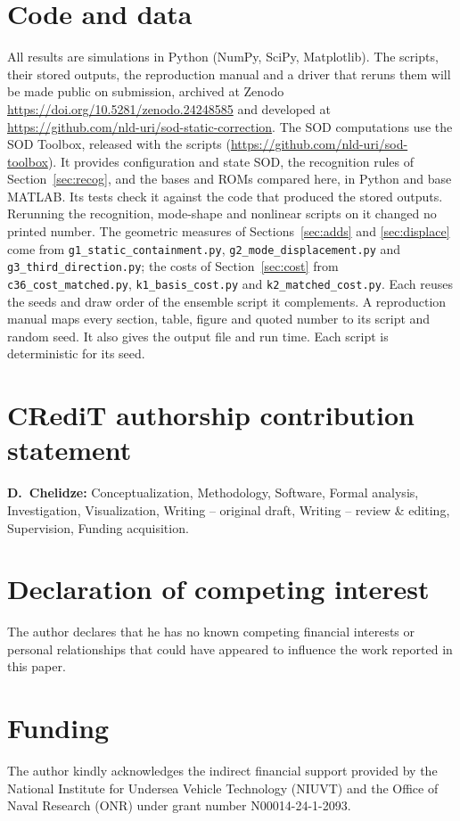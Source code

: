 \documentclass[preprint,12pt]{elsarticle}
\begin{document}
\section{Code and data}\label{app:repro}
All results are simulations in Python (NumPy, SciPy, Matplotlib). The scripts, their stored outputs, the reproduction manual and a driver that reruns them will be made public on submission, archived at Zenodo \url{https://doi.org/10.5281/zenodo.24248585} and developed at \url{https://github.com/nld-uri/sod-static-correction}.
The SOD computations use the SOD Toolbox, released with the scripts (\url{https://github.com/nld-uri/sod-toolbox}).
It provides configuration and state SOD, the recognition rules of Section~\ref{sec:recog}, and the bases and ROMs compared here, in Python and base MATLAB.
Its tests check it against the code that produced the stored outputs. Rerunning the recognition, mode-shape and nonlinear scripts on it changed no printed number.
The geometric measures of Sections~\ref{sec:adds} and \ref{sec:displace} come from \texttt{g1\_static\_containment.py}, \texttt{g2\_mode\_displacement.py} and \texttt{g3\_third\_direction.py}; the costs of Section~\ref{sec:cost} from \texttt{c36\_cost\_matched.py}, \texttt{k1\_basis\_cost.py} and \texttt{k2\_matched\_cost.py}. Each reuses the seeds and draw order of the ensemble script it complements.
A reproduction manual maps every section, table, figure and quoted number to its script and random seed. It also gives the output file and run time. Each script is deterministic for its seed.

\section*{CRediT authorship contribution statement}
\textbf{D.~Chelidze:} Conceptualization, Methodology, Software, Formal analysis, Investigation, Visualization, Writing -- original draft, Writing -- review \& editing, Supervision, Funding acquisition.

\section*{Declaration of competing interest}
The author declares that he has no known competing financial interests or personal relationships that could have appeared to influence the work reported in this paper.

\section*{Funding}
The author kindly acknowledges the indirect financial support provided by the National Institute for Undersea Vehicle Technology (NIUVT) and the Office of Naval Research (ONR) under grant number N00014-24-1-2093.
\end{document}
